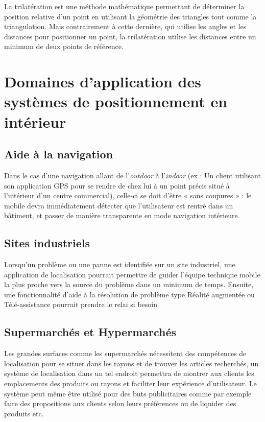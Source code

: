 \documentclass[12pt,a4paper]{report}
\begin{document}
La trilatération est une méthode mathématique permettant de déterminer la position relative d'un point en utilisant la géométrie des triangles tout comme la triangulation. Mais contrairement à cette dernière, qui utilise les angles et les distances pour positionner un point, la trilatération utilise les distances entre un minimum de deux points de référence.\cite{trilateration}


\section{Domaines d’application des systèmes de positionnement en intérieur}

\subsection{Aide à la navigation}
Dans le cas d’une navigation allant de l’\textit{outdoor} à l’\textit{indoor} (ex : Un client utilisant son application GPS pour se rendre de chez lui à un point précis situé à l’intérieur d’un centre commercial), celle-ci se doit d’être « sans coupures » : le mobile devra immédiatement détecter que l’utilisateur est rentré dans un bâtiment, et passer de manière transparente en mode navigation intérieure.

\subsection{Sites industriels}
 Lorsqu'un problème ou une panne est identifiée sur un site industriel, une application de localisation pourrait permettre de guider l’équipe technique mobile la plus proche vers la source du problème dans un minimum de temps. Ensuite, une fonctionnalité d’aide à la résolution de problème type Réalité augmentée ou Télé-assistance pourrait prendre le relai si besoin\cite{navigation}



\subsection{Supermarchés et Hypermarchés}
Les grandes surfaces comme les supermarchés nécessitent des compétences de localisation pour se situer dans les rayons et de trouver les articles recherchés, un système de localisation dans un tel endroit permettra de montrer aux clients les emplacements des produits ou rayons et faciliter leur expérience d’utilisateur.
Le système peut même être utilisé pour des buts publicitaires comme par exemple faire des propositions aux clients selon leurs préférences ou de liquider des produits etc.
\end{document}
